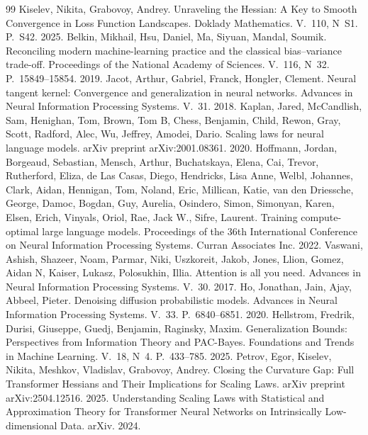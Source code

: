 \begin{thebibliography}{99}
 Kiselev, Nikita, Grabovoy, Andrey. Unraveling the Hessian: A Key to Smooth Convergence in Loss Function Landscapes. Doklady Mathematics. V.~110, N~S1. P.~S42. 2025.
 Belkin, Mikhail, Hsu, Daniel, Ma, Siyuan, Mandal, Soumik. Reconciling modern machine-learning practice and the classical bias--variance trade-off. Proceedings of the National Academy of Sciences. V.~116, N~32. P.~15849--15854. 2019.
 Jacot, Arthur, Gabriel, Franck, Hongler, Clement. Neural tangent kernel: Convergence and generalization in neural networks. Advances in Neural Information Processing Systems. V.~31. 2018.
 Kaplan, Jared, McCandlish, Sam, Henighan, Tom, Brown, Tom B, Chess, Benjamin, Child, Rewon, Gray, Scott, Radford, Alec, Wu, Jeffrey, Amodei, Dario. Scaling laws for neural language models. arXiv preprint arXiv:2001.08361. 2020.
 Hoffmann, Jordan, Borgeaud, Sebastian, Mensch, Arthur, Buchatskaya, Elena, Cai, Trevor, Rutherford, Eliza, de Las Casas, Diego, Hendricks, Lisa Anne, Welbl, Johannes, Clark, Aidan, Hennigan, Tom, Noland, Eric, Millican, Katie, van den Driessche, George, Damoc, Bogdan, Guy, Aurelia, Osindero, Simon, Simonyan, Karen, Elsen, Erich, Vinyals, Oriol, Rae, Jack W., Sifre, Laurent. Training compute-optimal large language models. Proceedings of the 36th International Conference on Neural Information Processing Systems. Curran Associates Inc. 2022.
 Vaswani, Ashish, Shazeer, Noam, Parmar, Niki, Uszkoreit, Jakob, Jones, Llion, Gomez, Aidan N, Kaiser, Lukasz, Polosukhin, Illia. Attention is all you need. Advances in Neural Information Processing Systems. V.~30. 2017.
 Ho, Jonathan, Jain, Ajay, Abbeel, Pieter. Denoising diffusion probabilistic models. Advances in Neural Information Processing Systems. V.~33. P.~6840--6851. 2020.
 Hellstrom, Fredrik, Durisi, Giuseppe, Guedj, Benjamin, Raginsky, Maxim. Generalization Bounds: Perspectives from Information Theory and PAC-Bayes. Foundations and Trends in Machine Learning. V.~18, N~4. P.~433--785. 2025.
 Petrov, Egor, Kiselev, Nikita, Meshkov, Vladislav, Grabovoy, Andrey. Closing the Curvature Gap: Full Transformer Hessians and Their Implications for Scaling Laws. arXiv preprint arXiv:2504.12516. 2025.
 Understanding Scaling Laws with Statistical and Approximation Theory for Transformer Neural Networks on Intrinsically Low-dimensional Data. arXiv. 2024.

\end{thebibliography}
